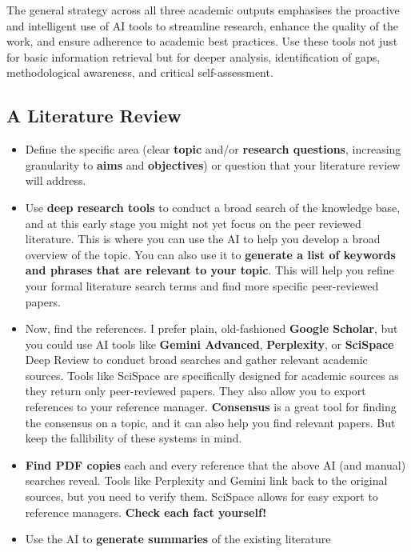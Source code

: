 \documentclass[
  10t,
]{article}
\providecommand{\tightlist}{%
  \setlength{\itemsep}{0pt}\setlength{\parskip}{0pt}}
\begin{document}
The general strategy across all three academic outputs emphasises the
proactive and intelligent use of AI tools to streamline research,
enhance the quality of the work, and ensure adherence to academic best
practices. Use these tools not just for basic information retrieval but
for deeper analysis, identification of gaps, methodological awareness,
and critical self-assessment.

\subsection{A Literature Review}\label{a-literature-review}

\begin{itemize}
\tightlist
\item
  Define the specific area (clear \textbf{topic} and/or \textbf{research
  questions}, increasing granularity to \textbf{aims} and
  \textbf{objectives}) or question that your literature review will
  address.
\item
  Use \textbf{deep research tools} to conduct a broad search of the
  knowledge base, and at this early stage you might not yet focus on the
  peer reviewed literature. This is where you can use the AI to help you
  develop a broad overview of the topic. You can also use it to
  \textbf{generate a list of keywords and phrases that are relevant to
  your topic}. This will help you refine your formal literature search
  terms and find more specific peer-reviewed papers.
\item
  Now, find the references. I prefer plain, old-fashioned \textbf{Google
  Scholar}, but you could use AI tools like \textbf{Gemini Advanced},
  \textbf{Perplexity}, or \textbf{SciSpace} Deep Review to conduct broad
  searches and gather relevant academic sources. Tools like SciSpace are
  specifically designed for academic sources as they return only
  peer-reviewed papers. They also allow you to export references to your
  reference manager. \textbf{Consensus} is a great tool for finding the
  consensus on a topic, and it can also help you find relevant papers.
  But keep the fallibility of these systems in mind.
\item
  \textbf{Find PDF copies} each and every reference that the above AI
  (and manual) searches reveal. Tools like Perplexity and Gemini link
  back to the original sources, but you need to verify them. SciSpace
  allows for easy export to reference managers. {\textbf{Check each fact
  yourself!}}
\item
  Use the AI to \textbf{generate summaries} of the existing literature

\end{itemize}
\end{document}
